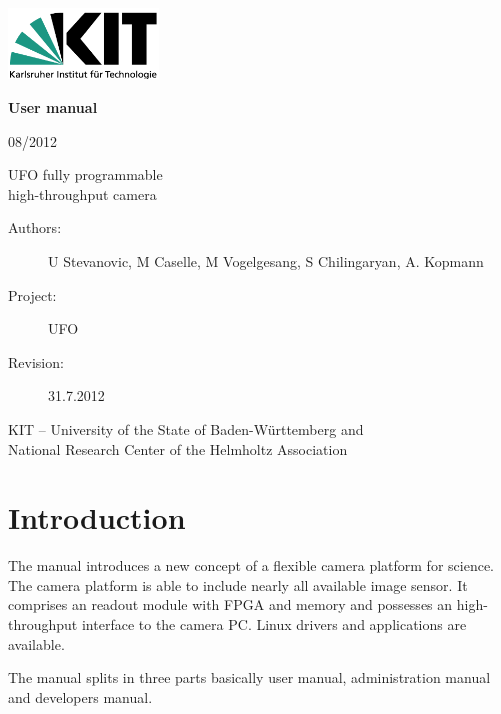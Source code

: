 \documentclass[12pt,a4paper,twoside,parskip=half+]{scrbook}
\begin{document}
\begin{titlepage}
\includegraphics[width=4cm]{images/kit_logo.png}


\hspace{4cm}
\begin{minipage}{12cm}
\vspace{3cm}
{\LARGE\bf User manual}

\vspace{0.2cm}
08/2012

\vspace{2.5cm}
{\LARGE UFO fully programmable\\[0.7ex]
 high-throughput camera}

\end{minipage}

\vfill
\hspace{4cm}
\begin{minipage}{12cm}
\begin{description}
\item[\textnormal{Authors:}] U Stevanovic, M Caselle, M Vogelgesang, S Chilingaryan, A. Kopmann
\item[\textnormal{Project:}] UFO 
\item[\textnormal{Revision:}] 31.7.2012 
\end{description}

\vspace{3cm}
KIT -- University of the State of Baden-Württemberg and\\
National Research Center of the Helmholtz Association
\end{minipage}
\end{titlepage}

\tableofcontents


\chapter*{Introduction}


The manual introduces a new concept of a flexible camera platform for science. The camera platform is able
to include nearly all available image sensor. It comprises an readout module with FPGA and memory and 
possesses an high-throughput interface to the camera PC. Linux drivers and applications are available.

The manual splits in three parts basically user manual, administration manual and developers manual.
\end{document}
